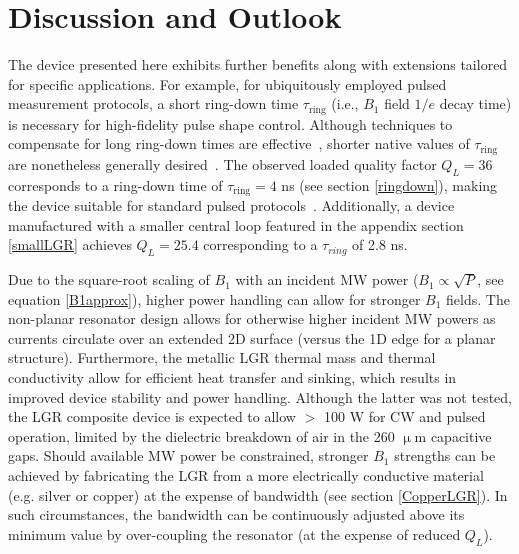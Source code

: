 
\chapter{Discussion and Outlook} \label{ch4}

The device presented here exhibits further benefits along with extensions tailored for specific applications. For example, for ubiquitously employed pulsed measurement protocols, a short ring-down time $\tau_\text{ring}$ (i.e., $B_1$ field $1/e$ decay time) is necessary for high-fidelity pulse shape control. Although techniques to compensate for long ring-down times are effective~\cite{tabuchi2010total,borneman2012bandwidth,peshkovsky2005rf}, shorter native values of $\tau_\text{ring}$ are nonetheless generally desired~\cite{pfenninger1995general,rinard2005loopgap}. The observed loaded quality factor $Q_L = 36$ corresponds to a ring-down time of $\tau_\text{ring} = 4$ ns (see section \ref{ringdown}), making the device suitable for standard pulsed protocols~\cite{Smeltzer2009Quantum, Jelezko2004Observation}. Additionally, a device manufactured with a smaller central loop featured in the appendix section \ref{smallLGR} achieves $Q_L =25.4$ corresponding to a $\tau_{ring}$ of 2.8 ns.


Due to the square-root scaling of $B_1$ with an incident MW power ($B_1 \propto \sqrt{P}$, see equation \ref{B1approx}), higher power handling can allow for stronger $B_1$ fields. The non-planar resonator design allows for otherwise higher incident MW powers as currents circulate over an extended 2D surface (versus the 1D edge for a planar structure). Furthermore, the metallic LGR thermal mass and  thermal conductivity allow for efficient heat transfer and sinking, which results in improved device stability and power handling. Although the latter was not tested, the LGR composite device is expected to allow $>\!$ 100 W for CW and pulsed operation, limited by the dielectric breakdown of air in the 260 $\upmu$m capacitive gaps. Should available MW power be constrained, stronger $B_1$ strengths can be achieved by fabricating the LGR from a more electrically conductive material (e.g. silver or copper) at the expense of bandwidth (see section \ref{CopperLGR}). In such circumstances, the bandwidth can be continuously adjusted above its minimum value by over-coupling the resonator (at the expense of reduced $Q_L$). 

